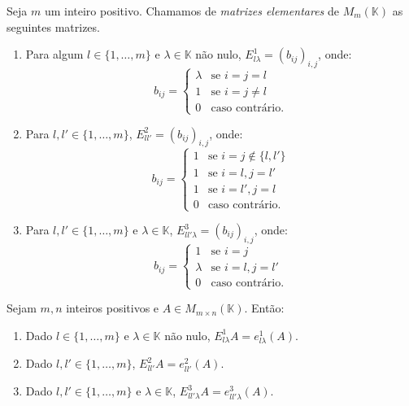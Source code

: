 \begin{definition}
    Seja $m$ um inteiro positivo.
    Chamamos de \emph{matrizes elementares} de $M_{m}(\mathbb K)$ as seguintes matrizes.
        \begin{enumerate}
            \item Para algum $l\in \{1, \ldots, m\}$ e $\lambda \in \mathbb K$ não nulo, $E_{l\lambda}^1=(b_{ij})_{i, j}$, onde:
            \begin{equation*}
                b_{ij} = \begin{cases}
                    \lambda & \text{se } i=j=l \\
                    1 & \text{se } i=j\neq l \\
                    0 & \text{caso contrário.}
            \end{cases}
            \end{equation*}
            \item Para $l, l'\in \{1, \ldots, m\}$, $E_{l l'}^2=(b_{ij})_{i, j}$, onde:
            \begin{equation*}
                b_{ij} = \begin{cases}
                    1 & \text{se } i=j\notin\{l, l'\} \\
                    1 & \text{se } i=l, j=l' \\
                    1 & \text{se } i=l', j=l \\
                    0 & \text{caso contrário.}
                \end{cases}
            \end{equation*}
            \item Para $l, l'\in \{1, \ldots, m\}$ e $\lambda \in \mathbb K$, $E_{l l'\lambda}^3=(b_{ij})_{i, j}$, onde:
            \begin{equation*}
                b_{ij} = \begin{cases}
                    1 & \text{se } i=j \\
                    \lambda & \text{se } i=l, j=l' \\
                    0 & \text{caso contrário.}
                \end{cases}
            \end{equation*}
        \end{enumerate}

        \begin{lemma}
            Sejam $m, n$ inteiros positivos e $A\in M_{m \times n}(\mathbb K)$.
            Então:
            \begin{enumerate}
                \item Dado $l\in \{1, \ldots, m\}$ e $\lambda \in \mathbb K$ não nulo, $E_{l\lambda}^1 A = e_{l\lambda}^1(A)$.
                \item Dado $l, l'\in \{1, \ldots, m\}$, $E_{l l'}^2 A = e_{l l'}^2(A)$.
                \item Dado $l, l'\in \{1, \ldots, m\}$ e $\lambda \in \mathbb K$, $E_{l l'\lambda}^3 A = e_{l l'\lambda}^3(A)$.
            \end{enumerate}
        \end{lemma}


\end{definition}
